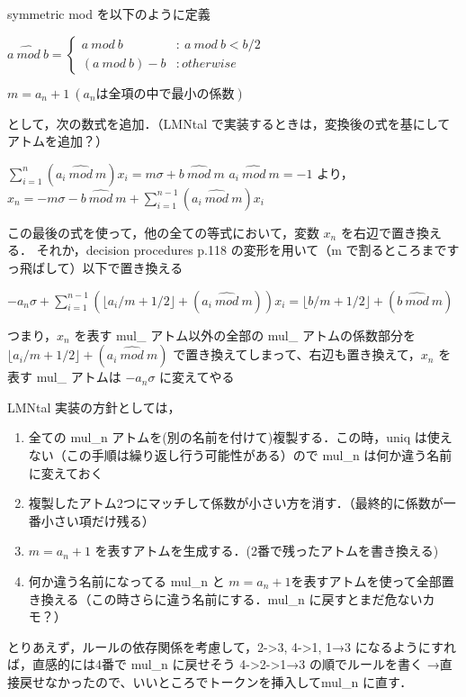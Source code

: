 symmetric mod を以下のように定義
\begin{center}
    $ a \: \widehat{mod}\: b = 
    \begin{cases}
        a \:mod\: b & :\:a \:mod\: b < b/2\\
        (a\:mod\:b)-b & :otherwise
    \end{cases}
    $
\end{center}

\begin{center}
    $m = a_n + 1 \:(a_n は全項の中で最小の係数)$
\end{center}
として，次の数式を追加．（LMNtal で実装するときは，変換後の式を基にしてアトムを追加？）
\begin{center}
    $\sum_{i=1}^n(a_i \:\widehat{mod}\: m)x_i = m \sigma + b \:\widehat{mod}\: m$
    $a_i \:\widehat{mod}\: m = -1$ より，
    $x_n = -m \sigma - b \:\widehat{mod}\:m + \sum_{i=1}^{n-1}(a_i \:\widehat{mod}\: m)x_i$
\end{center}
この最後の式を使って，他の全ての等式において，変数 $x_n$ を右辺で置き換える．
それか，decision procedures p.118 の変形を用いて（m で割るところまですっ飛ばして）以下で置き換える
\begin{center}
    $-a_n\sigma + \sum_{i=1}^{n-1}(\lfloor a_i/m + 1/2 \rfloor + (a_i \:\widehat{mod}\: m))x_i = 
    \lfloor b/m + 1/2 \rfloor + (b \:\widehat{mod}\: m)$
\end{center}
つまり，$x_n$ を表す mul\_ アトム以外の全部の mul\_ アトムの係数部分を $\lfloor a_i/m + 1/2 \rfloor + (a_i \:\widehat{mod}\: m)$
で置き換えてしまって、右辺も置き換えて，$x_n$ を表す mul\_ アトムは $-a_n\sigma$ に変えてやる

LMNtal 実装の方針としては，
\begin{enumerate}
    \item 全ての mul\_n アトムを(別の名前を付けて)複製する．この時，uniq は使えない（この手順は繰り返し行う可能性がある）ので mul\_n は何か違う名前に変えておく
    \item 複製したアトム2つにマッチして係数が小さい方を消す．（最終的に係数が一番小さい項だけ残る）
    \item $m = a_n + 1$ を表すアトムを生成する．(2番で残ったアトムを書き換える)
    \item 何か違う名前になってる mul\_n と $m=a_n+1$を表すアトムを使って全部置き換える（この時さらに違う名前にする．mul\_n に戻すとまだ危ないカモ？）
\end{enumerate}
とりあえず，ルールの依存関係を考慮して，2->3, 4->1, 1→3 になるようにすれば，直感的には4番で mul\_n に戻せそう
4->2->1→3 の順でルールを書く
→直接戻せなかったので、いいところでトークンを挿入してmul\_n に直す．


